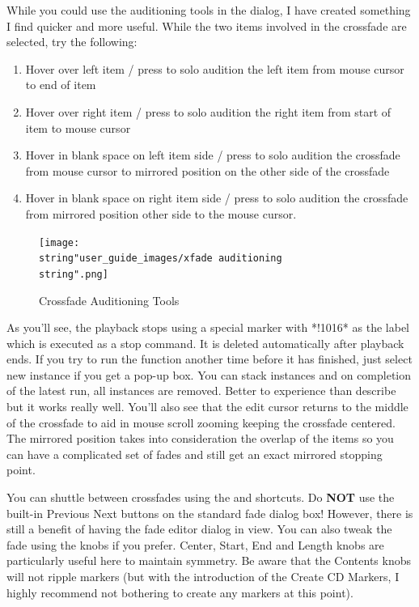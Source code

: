 \documentclass[10pt,american]{article}
\begin{document}
While you could use the auditioning tools in the dialog, I have created
something I find quicker and more useful. While the two items involved in the
crossfade are selected, try the following:
\begin{enumerate}
\item Hover over left item / press  to solo audition the left item from
mouse cursor to end of item
\item Hover over right item / press  to solo audition the right item
from start of item to mouse cursor
\item Hover in blank space on left item side / press  to solo audition
the crossfade from mouse cursor to mirrored position on the other side of the
crossfade
\item Hover in blank space on right item side / press  to solo audition
the crossfade from mirrored position other side to the mouse cursor.
\end{enumerate}
\begin{figure}
\texttt{[image: \\string"user\_guide\_images/xfade auditioning\\string".png]}

\caption{Crossfade Auditioning Tools}

\end{figure}

As you'll see, the playback stops using a special marker with {*}!1016{*} as the
label which is executed as a stop command. It is deleted automatically after
playback ends. If you try to run the function another time before it has
finished, just select new instance if you get a pop-up box. You can stack
instances and on completion of the latest run, all instances are removed. Better
to experience than describe but it works really well. You'll also see that the
edit cursor returns to the middle of the crossfade to aid in mouse scroll
zooming keeping the crossfade centered. The mirrored position takes into
consideration the overlap of the items so you can have a complicated set of
fades and still get an exact mirrored stopping point.

You can shuttle between crossfades using the  and  shortcuts. Do
\textbf{NOT} use the built-in Previous Next buttons on the standard fade dialog
box! However, there is still a benefit of having the fade editor dialog in view.
You can also tweak the fade using the knobs if you prefer. Center, Start, End
and Length knobs are particularly useful here to maintain symmetry. Be aware
that the Contents knobs will not ripple markers (but with the introduction of
the Create CD Markers, I highly recommend not bothering to create any markers at
this point).
\end{document}
